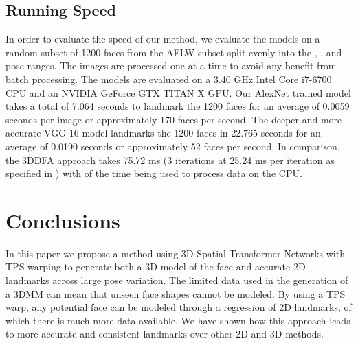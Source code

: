 \documentclass[10pt,twocolumn,letterpaper]{article}
\begin{document}
\subsection{Running Speed}
In order to evaluate the speed of our method, we evaluate the models on a random subset of 1200 faces from the AFLW subset split evenly into the , , and  pose ranges. The images are processed one at a time to avoid any benefit from batch processing. The models are evaluated on a 3.40 GHz Intel Core i7-6700 CPU and an NVIDIA GeForce GTX TITAN X GPU. Our AlexNet trained model takes a total of 7.064 seconds to landmark the 1200 faces for an average of 0.0059 seconds per image or approximately 170 faces per second. The deeper and more accurate VGG-16 model landmarks the 1200 faces in 22.765 seconds for an average of 0.0190 seconds or approximately 52 faces per second. In comparison, the 3DDFA approach \cite{Zhu16falp} takes 75.72 ms (3 iterations at 25.24 ms per iteration as specified in \cite{Zhu16falp}) with  of the time being used to process data on the CPU. 

\section{Conclusions}
In this paper we propose a method using 3D Spatial Transformer Networks with TPS warping to generate both a 3D model of the face and accurate 2D landmarks across large pose variation. The limited data used in the generation of a 3DMM can mean that unseen face shapes cannot be modeled. By using a TPS warp, any potential face can be modeled through a regression of 2D landmarks, of which there is much more data available. We have shown how this approach leads to more accurate and consistent landmarks over other 2D and 3D methods.

{\small


}
\end{document}
